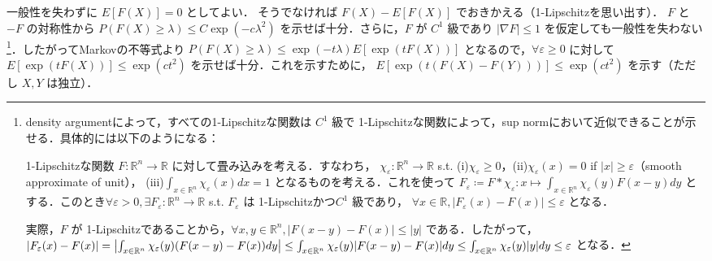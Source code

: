 \documentclass{ltjsarticle}
\makeatletter
\theoremstyle{mystyle1}
\theoremstyle{mystyle2}
\theoremstyle{mystyle3}
\renewenvironment{proof}[1][\proofname]{\par
  \pushQED{\qed}%
  \normalfont
  \topsep6\p@\@plus6\p@ \trivlist
  \item[\hskip\labelsep{\bfseries\sffamily #1}]\ignorespaces
}{%
  \popQED\endtrivlist\@endpefalse
}
\renewcommand\proofname{証明}
\makeatother
\begin{document}
\begin{proof}
    一般性を失わずに $E[F(X)]=0$ としてよい． そうでなければ $F(X)-E[F(X)]$ でおきかえる（1-Lipschitzを思い出す）．
    $F$ と $-F$ の対称性から $P(F(X)\geq\lambda)\leq C\exp(-c\lambda^2)$ を示せば十分．さらに，$F$ が $C^1$ 級であり $|\nabla F|\leq 1$ を仮定しても一般性を失わない\footnote{
        density argumentによって，すべての1-Lipschitzな関数は $C^1$ 級で 1-Lipschitzな関数によって，sup normにおいて近似できることが示せる．具体的には以下のようになる：

        1-Lipschitzな関数 $F:\mathbb{R}^n\to\mathbb{R}$ に対して畳み込みを考える．すなわち， $\chi_\varepsilon:\mathbb{R}^n\to\mathbb{R}$ s.t. (i)$\chi_\varepsilon\geq 0$，(ii)$\chi_\varepsilon(x)=0$ if $|x|\geq\varepsilon$（smooth approximate of unit）， (iii)$\int_{x\in\mathbb{R}^n}\chi_\varepsilon(x)dx=1$ となるものを考える．これを使って $F_\varepsilon\coloneqq F*\chi_\varepsilon: x\mapsto\int_{x\in\mathbb{R}^n}\chi_\varepsilon(y)F(x-y)dy$ とする．このとき$\forall\varepsilon>0,\exists F_\varepsilon:\mathbb{R}^n\to\mathbb{R}$ s.t. $F_\varepsilon$ は 1-Lipschitzかつ$C^1$ 級であり， $\forall x\in\mathbb{R},|F_\varepsilon(x)-F(x)|\leq\varepsilon$ となる．

        実際，$F$ が 1-Lipschitzであることから，$\forall x,y\in\mathbb{R}^n,|F(x-y)-F(x)|\leq|y|$ である．したがって，$|F_\varepsilon(x)-F(x)|=\mleft|\int_{x\in\mathbb{R}^n}\chi_\varepsilon(y)(F(x-y)-F(x))dy\mright|\leq\int_{x\in\mathbb{R}^n}\chi_\varepsilon(y)|F(x-y)-F(x)|dy\leq\int_{x\in\mathbb{R}^n}\chi_\varepsilon(y)|y|dy\leq\varepsilon$ となる．
    }．したがってMarkovの不等式より $P(F(X)\geq\lambda)\leq \exp(-t\lambda)E[\exp(tF(X))]$ となるので，$\forall\varepsilon\geq 0$ に対して $E[\exp(t F(X))]\leq\exp(ct^2)$ を示せば十分．これを示すために， $E[\exp(t(F(X)-F(Y)))]\leq\exp(ct^2)$ を示す（ただし $X,Y$ は独立）．


\end{proof}
\end{document}
